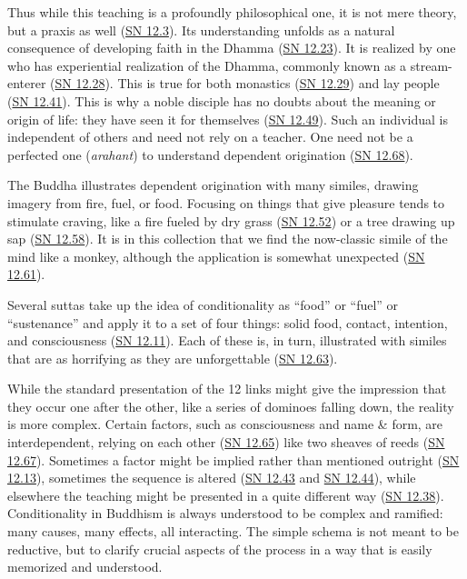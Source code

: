 \documentclass[12pt,openany]{book}%
\begin{document}
Thus while this teaching is a profoundly philosophical one, it is not mere theory, but a praxis as well (\href{https://suttacentral.net/sn12.3}{SN 12.3}). Its understanding unfolds as a natural consequence of developing faith in the Dhamma (\href{https://suttacentral.net/sn12.23}{SN 12.23}). It is realized by one who has experiential realization of the Dhamma, commonly known as a stream-enterer (\href{https://suttacentral.net/sn12.28}{SN 12.28}). This is true for both monastics (\href{https://suttacentral.net/sn12.29}{SN 12.29}) and lay people (\href{https://suttacentral.net/sn12.41}{SN 12.41}). This is why a noble disciple has no doubts about the meaning or origin of life: they have seen it for themselves (\href{https://suttacentral.net/sn12.49}{SN 12.49}). Such an individual is independent of others and need not rely on a teacher. One need not be a perfected one (\textit{arahant}) to understand dependent origination (\href{https://suttacentral.net/sn12.68}{SN 12.68}).

The Buddha illustrates dependent origination with many similes, drawing imagery from fire, fuel, or food. Focusing on things that give pleasure tends to stimulate craving, like a fire fueled by dry grass (\href{https://suttacentral.net/sn12.52}{SN 12.52}) or a tree drawing up sap (\href{https://suttacentral.net/sn12.58}{SN 12.58}). It is in this collection that we find the now-classic simile of the mind like a monkey, although the application is somewhat unexpected (\href{https://suttacentral.net/sn12.61}{SN 12.61}).

Several suttas take up the idea of conditionality as “food” or “fuel” or “sustenance” and apply it to a set of four things: solid food, contact, intention, and consciousness (\href{https://suttacentral.net/sn12.11}{SN 12.11}). Each of these is, in turn, illustrated with similes that are as horrifying as they are unforgettable (\href{https://suttacentral.net/sn12.63}{SN 12.63}).

While the standard presentation of the 12 links might give the impression that they occur one after the other, like a series of dominoes falling down, the reality is more complex. Certain factors, such as consciousness and name \& form, are interdependent, relying on each other (\href{https://suttacentral.net/sn12.65}{SN 12.65}) like two sheaves of reeds (\href{https://suttacentral.net/sn12.67}{SN 12.67}). Sometimes a factor might be implied rather than mentioned outright (\href{https://suttacentral.net/sn12.13}{SN 12.13}), sometimes the sequence is altered (\href{https://suttacentral.net/sn12.43}{SN 12.43} and \href{https://suttacentral.net/sn12.44}{SN 12.44}), while elsewhere the teaching might be presented in a quite different way (\href{https://suttacentral.net/sn12.38}{SN 12.38}). Conditionality in Buddhism is always understood to be complex and ramified: many causes, many effects, all interacting. The simple schema is not meant to be reductive, but to clarify crucial aspects of the process in a way that is easily memorized and understood.
\end{document}
